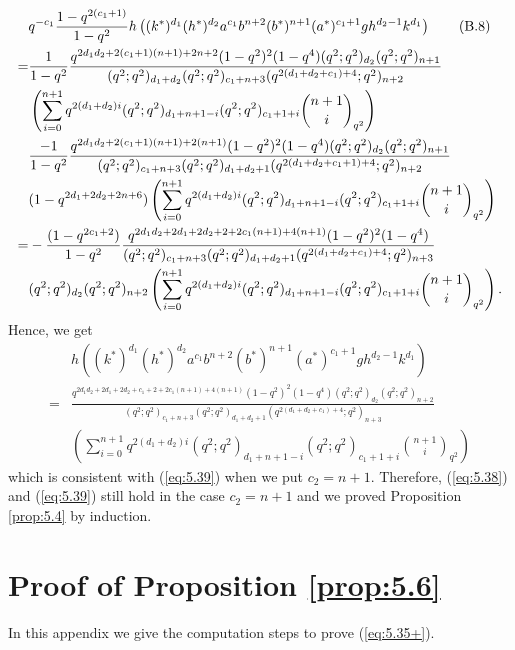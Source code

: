 \documentclass[table,a4paper,reqno]{amsart}
\numberwithin{equation}{section}
\theoremstyle{definition}
\begin{document}
\begin{align}\stepcounter{equation}
        &q^{-c_1}\frac{1-q^{2(c_1+1)}}{1-q^2}h\left((k^*)^{d_1}(h^*)^{d_2}a^{c_1}b^{n+2}(b^*)^{n+1}(a^*)^{c_1+1}gh^{d_2-1}k^{d_1}\right)\tag{B.8}\\
        =&\frac{1}{1-q^2}\frac{q^{2d_1d_2+2(c_1+1)(n+1)+2n+2}(1-q^2)^2(1-q^4)(q^2;q^2)_{d_2}(q^2;q^2)_{n+1}}{(q^2;q^2)_{d_1+d_2}(q^2;q^2)_{c_1+n+3}(q^{2(d_1+d_2+c_1)+4};q^2)_{n+2}}\notag\\
        &\left(\sum_{i=0}^{n+1}q^{2(d_1+d_2)i}(q^2;q^2)_{d_1+n+1-i}(q^2;q^2)_{c_1+1+i}{n+1\choose i}_{q^2}\right)\notag\\
        &\frac{-1}{1-q^2}\frac{q^{2d_1d_2+2(c_1+1)(n+1)+2(n+1)}(1-q^2)^2(1-q^4)(q^2;q^2)_{d_2}(q^2;q^2)_{n+1}}{(q^2;q^2)_{c_1+n+3}(q^2;q^2)_{d_1+d_2+1}(q^{2(d_1+d_2+c_1+1)+4};q^2)_{n+2}}\notag\\
        &(1-q^{2d_1+2d_2+2n+6})\left(\sum_{i=0}^{n+1}q^{2(d_1+d_2)i}(q^2;q^2)_{d_1+n+1-i}(q^2;q^2)_{c_1+1+i}{n+1\choose i}_{q^2}\right)\notag\\
        =&-\frac{(1-q^{2c_1+2})}{1-q^2}\frac{q^{2d_1d_2+2d_1+2d_2+2+2c_1(n+1)+4(n+1)}(1-q^2)^2(1-q^4)}{(q^2;q^2)_{c_1+n+3}(q^2;q^2)_{d_1+d_2+1}(q^{2(d_1+d_2+c_1)+4};q^2)_{n+3}}\notag\\
        &(q^2;q^2)_{d_2}(q^2;q^2)_{n+2}\left(\sum_{i=0}^{n+1}q^{2(d_1+d_2)i}(q^2;q^2)_{d_1+n+1-i}(q^2;q^2)_{c_1+1+i}{n+1\choose i}_{q^2}\right).\notag
\end{align}
Hence, we get
\begin{equation}
    \begin{split}
        &h\left((k^*)^{d_1}(h^*)^{d_2}a^{c_1}b^{n+2}(b^*)^{n+1}(a^*)^{c_1+1}gh^{d_2-1}k^{d_1}\right)\\
        =&\frac{q^{2d_1d_2+2d_1+2d_2+c_1+2+2c_1(n+1)+4(n+1)}(1-q^2)^2(1-q^4)(q^2;q^2)_{d_2}(q^2;q^2)_{n+2}}{(q^2;q^2)_{c_1+n+3}(q^2;q^2)_{d_1+d_2+1}(q^{2(d_1+d_2+c_1)+4};q^2)_{n+3}}\\
        &\left(\sum_{i=0}^{n+1}q^{2(d_1+d_2)i}(q^2;q^2)_{d_1+n+1-i}(q^2;q^2)_{c_1+1+i}{n+1\choose i}_{q^2}\right)
    \end{split}
\end{equation}
which is consistent with (\ref{eq:5.39}) when we put $c_2=n+1$. Therefore, (\ref{eq:5.38}) and (\ref{eq:5.39}) still hold in the case $c_2=n+1$ and we proved Proposition \ref{prop:5.4} by induction.
\newpage
\section{Proof of Proposition \ref{prop:5.6}}\label{append_b}
In this appendix we give the computation steps to prove (\ref{eq:5.35+}).
\end{document}
